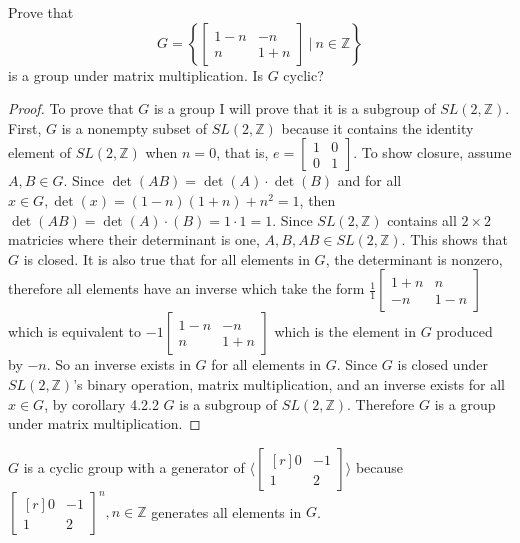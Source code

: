 \documentclass[titlepage]{article}
\newenvironment{problem}[2][Problem]{\begin{trivlist}
\item[\hskip \labelsep {\bfseries #1}\hskip \labelsep {\bfseries #2.}]}{\end{trivlist}}
\begin{document}
\begin{problem}{3}
Prove that 
$$ G = \left\{\begin{bmatrix}1-n & -n \\ n & 1+n \end{bmatrix} \ \bigg| \ n \in \mathbb{Z} \right\} $$
is a group under matrix multiplication. Is $G$ cyclic?
\begin{proof}
To prove that $G$ is a group I will prove that it is a subgroup of $SL(2,\mathbb{Z})$. First, $G$ is a nonempty subset of $SL(2,\mathbb{Z})$ because it contains the identity element of $SL(2,\mathbb{Z})$ when $n=0$, that is, $e = \left[\begin{smallmatrix}1 & 0 \\ 0 & 1\end{smallmatrix}\right]$. To show closure, assume $A,B \in G$. Since $\det(AB) = \det(A)\cdot \det(B)$ and for all $x\in G, \det(x) = (1-n)(1+n)+n^2 = 1$, then $\det(AB) = \det(A)\cdot(B) = 1\cdot 1 = 1$. Since $SL(2,\mathbb{Z})$ contains all $2\times2$ matricies where their determinant is one, $A,B,AB\in SL(2,\mathbb{Z})$. This shows that $G$ is closed. It is also true that for all elements in $G$, the determinant is nonzero, therefore all elements have an inverse which take the form $\frac{1}{1}\left[\begin{smallmatrix}1+n & n \\ -n & 1-n \end{smallmatrix}\right]$ which is equivalent to $-1\left[\begin{smallmatrix}1-n & -n \\ n & 1+n \end{smallmatrix}\right]$ which is the element in $G$ produced by $-n$. So an inverse exists in $G$ for all elements in $G$.  Since $G$ is closed under $SL(2,\mathbb{Z})$'s binary operation, matrix multiplication, and an inverse exists for all $x\in G$, by corollary 4.2.2 $G$ is a subgroup of $SL(2,\mathbb{Z})$. Therefore $G$ is a group under matrix multiplication.
\end{proof}
$G$ is a cyclic group with a generator of $\langle\left[\begin{smallmatrix*}[r]0 & -1 \\ 1 & 2 \end{smallmatrix*}\right]\rangle$ because $\left[\begin{smallmatrix*}[r]0 & -1 \\ 1 & 2 \end{smallmatrix*}\right]^n , n \in \mathbb{Z}$ generates all elements in $G$.
\end{problem}
\end{document}
